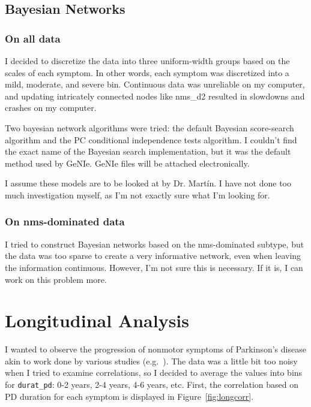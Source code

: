 \documentclass[10pt]{article}
\begin{document}
\begin{multicols}{2}
\subsection{Bayesian Networks}

\subsubsection{On all data}

I decided to discretize the data into three uniform-width groups based on the
scales of each symptom. In other words, each symptom was discretized into a
mild, moderate, and severe bin. Continuous data was unreliable on my computer,
and updating intricately connected nodes like nms\_d2 resulted in slowdowns and
crashes on my computer.

Two bayesian network algorithms were tried: the default Bayesian score-search
algorithm and the PC conditional independence tests algorithm. I couldn't find
the exact name of the Bayesian search implementation, but it was the default
method used by GeNIe. GeNIe files will be attached electronically.

I assume these models are to be looked at by Dr. Mart\'in. I have not done too
much investigation myself, as I'm not exactly sure what I'm looking for.

\subsubsection{On nms-dominated data}
I tried to construct Bayesian networks based on the nms-dominated subtype, but
the data was too sparse to create a very informative network, even when leaving
the information continuous. However, I'm not sure this is necessary. If it is,
I can work on this problem more.



\section{Longitudinal Analysis}
\label{sec:longitudinal}

I wanted to observe the progression of nonmotor symptoms of Parkinson's disease akin to work done
by various studies (e.g.\ \cite{onsetpd,vu12,zahodne12}). The data was a little bit too noisy when
I tried to examine correlations, so I decided to average the values into bins for
\texttt{durat\_pd}: 0-2 years, 2-4 years, 4-6 years, etc. First, the correlation based on PD
duration for each symptom is displayed in Figure~\ref{fig:longcorr}.


\end{multicols}
\end{document}
